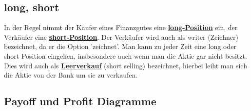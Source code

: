 \documentclass[a4paper, pagesize=pdftex, pdftex, twoside, headsepline, index=totoc,toc=listof, fontsize=10pt, cleardoublepage=empty, headinclude, DIV=13, BCOR=13mm]{scrartcl}
\newcommand{\bet}[1]{\uline{\textbf{#1}}} %
\newcommand{\Index}[1]{\uline{\textbf{#1}}\index{#1}} %
\begin{document}

\subsection{long, short} %
\label{sub: long,_short}

In der Regel nimmt der Käufer eines Finanzgutes eine \bet{long-Position} ein, der Verkäufer eine \bet{short-Position}.
Der Verkäufer wird auch als writer (Zeichner) bezeichnet, da er die Option 'zeichnet'. Man kann zu jeder Zeit eine long oder short Position eingehen, insbesondere auch wenn man die Aktie gar nicht besitzt. Dies wird auch als \Index{Leerverkauf} (short selling) bezeichnet, hierbei leiht man sich die Aktie von der Bank um sie zu verkaufen.

\vfill


\subsection{Payoff und Profit Diagramme} %
\label{sub:payoff_und_profit_diagramme}
\end{document}
